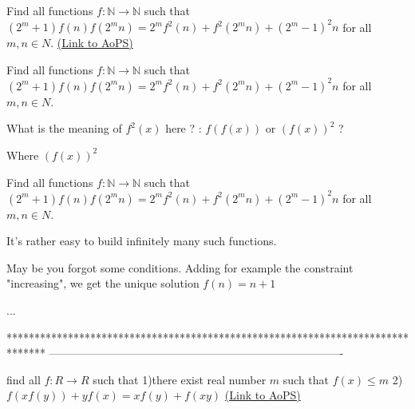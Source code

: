 \begin{problem}
	Find all functions $f: \mathbb{N}\to\mathbb{N}$ such that $(2^m+1)f(n)f(2^{m}n)=2^mf^2(n)+f^2(2^{m}n)+(2^m-1)^2n$ for all $m,n{\in}N$.
	\flushright \href{https://artofproblemsolving.com/community/c6h574574}{(Link to AoPS)}
\end{problem}



\begin{solution}
	\begin{tcolorbox}Find all functions $f: \mathbb{N}\to\mathbb{N}$ such that $(2^m+1)f(n)f(2^{m}n)=2^mf^2(n)+f^2(2^{m}n)+(2^m-1)^2n$ for all $m,n{\in}N$.\end{tcolorbox}
What is the meaning of $f^2(x)$ here ? : $f(f(x))$ or $(f(x))^2$ ?
\end{solution}



\begin{solution}
	Where  $(f(x))^2$
\end{solution}



\begin{solution}
	\begin{tcolorbox}Find all functions $f: \mathbb{N}\to\mathbb{N}$ such that $(2^m+1)f(n)f(2^{m}n)=2^mf^2(n)+f^2(2^{m}n)+(2^m-1)^2n$ for all $m,n{\in}N$.\end{tcolorbox}
It's rather easy to build infinitely many such functions.

May be you forgot some conditions. Adding for example the constraint "increasing", we get the unique solution $f(n)=n+1$

...
\end{solution}
*******************************************************************************
-------------------------------------------------------------------------------

\begin{problem}
	find all $f:R\longrightarrow{R}$ such that
1)there exist real number $m$ such that $f(x)\leq{m}$ 
2)$f(xf(y))+yf(x)=xf(y)+f(xy)$
	\flushright \href{https://artofproblemsolving.com/community/c6h574907}{(Link to AoPS)}
\end{problem}



